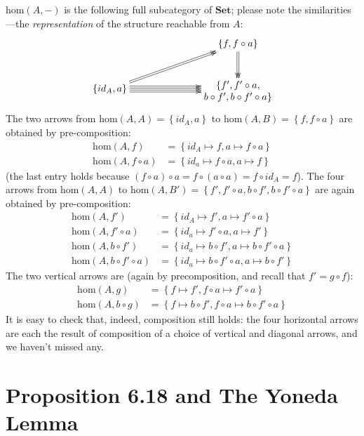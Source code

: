 \documentclass[10pt,letterpaper]{article}
\newcommand{\set}[1]{\left\{#1\right\}}
\begin{document}
$\mbox{hom}(A,-)$ is the following full subcategory of $\mathbf{Set}$; please
note the similarities---the {\em representation} of the structure reachable from $A$:
\[ \xymatrix@C=1in{
    & \set{f, f \circ a} \ar@<1pt>[d] \ar@<-1pt>[d] \\
  \set{id_A, a} \ar@<1pt>[ru] \ar@<-1pt>[ru]
                \ar@<3pt>[r] \ar@<1pt>[r] \ar@<-1pt>[r] \ar@<-3pt>[r]
    & \txt{$\{f', f' \circ a,$\\ $b \circ f', b \circ f' \circ a\}$} \\
} \]
The two arrows from $\mbox{hom}(A,A) = \set{id_A, a}$ to $\mbox{hom}(A,B)
= \set{f, f \circ a}$ are obtained by pre-composition:
\begin{align*}
  \mbox{hom}(A,f) &= \set{ id_A \mapsto f, a \mapsto f \circ a } \\
  \mbox{hom}(A,f \circ a) &= \set{ id_a \mapsto f \circ a, a \mapsto f }
\end{align*}
(the last entry holds because $(f \circ a) \circ a = f \circ (a \circ a) = f
\circ id_A = f$).  The four arrows from $\mbox{hom}(A,A)$ to
$\mbox{hom}(A,B') = \set{f', f' \circ a, b \circ f', b \circ f' \circ a}$ are
again obtained by pre-composition:
\begin{align*}
  \mbox{hom}(A,f') &= \set{id_A \mapsto f', a \mapsto f' \circ a} \\
  \mbox{hom}(A,f' \circ a) &= \set{id_a \mapsto f' \circ a, a \mapsto f'} \\
  \mbox{hom}(A,b \circ f') &= \set{id_a \mapsto b \circ f', a \mapsto b \circ f' \circ a} \\
  \mbox{hom}(A,b \circ f' \circ a) &= \set{id_a \mapsto b \circ f' \circ a, a \mapsto b \circ f'}
\end{align*}
The two vertical arrows are (again by precomposition, and recall that $f' = g \circ f$):
\begin{align*}
  \mbox{hom}(A,g) &= \set{f \mapsto f', f \circ a \mapsto f' \circ a} \\
  \mbox{hom}(A,b \circ g) &= \set{f \mapsto b \circ f', f \circ a \mapsto b \circ f' \circ a}
\end{align*}
It is easy to check that, indeed, composition still holds: the four horizontal
arrows are each the result of composition of a choice of vertical and diagonal arrows,
and we haven't missed any.

\pagebreak
\section{Proposition 6.18 and The Yoneda Lemma}
\end{document}
